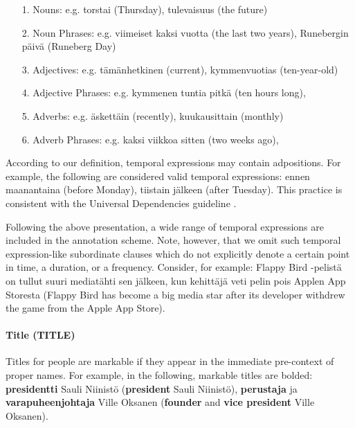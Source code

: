 \documentclass[11pt]{article}
\begin{document}
\begin{itemize}

\item[1.] Nouns: e.g. torstai (Thursday), tulevaisuus (the future)
\item[2.] Noun Phrases: e.g. viimeiset kaksi vuotta (the last two years),  Runebergin p\"aiv\"a (Runeberg Day)
\item[3.] Adjectives: e.g. t\"am\"anhetkinen (current), kymmenvuotias (ten-year-old) 
\item[4.] Adjective Phrases: e.g. kymmenen tuntia pitk\"a (ten hours long), 
\item[5.] Adverbs: e.g. \"askett\"ain (recently), kuukausittain (monthly)
\item[6.] Adverb Phrases: e.g. kaksi viikkoa sitten (two weeks ago),

\end{itemize}

According to our definition, temporal expressions may contain adpositions. For example, the following are considered valid temporal expressions: ennen maanantaina (before Monday), tiistain j\"alkeen (after Tuesday). This practice is consistent with the Universal Dependencies guideline \cite{}. 

Following the above presentation, a wide range of temporal expressions are included in the annotation scheme. Note, however, that we omit such temporal expression-like subordinate clauses which do not explicitly denote a certain point in time, a duration, or a frequency. Consider, for example: Flappy  Bird -pelist\"a on tullut suuri mediat\"ahti sen j\"alkeen, kun kehitt\"aj\"a veti pelin pois Applen App Storesta (Flappy Bird has become a big media star after its developer withdrew the game from the Apple App Store).


\paragraph{Title (TITLE)}

Titles for people are markable if they appear in the immediate pre-context of proper names. For example, in the following, markable titles are bolded: \textbf{presidentti} Sauli Niinist\"o (\textbf{president} Sauli Niinist\"o), \textbf{perustaja} ja \textbf{varapuheenjohtaja} Ville Oksanen (\textbf{founder} and \textbf{vice president} Ville Oksanen).   





\end{document}
